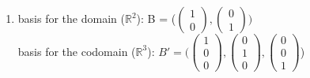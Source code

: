 \documentclass[notitlepage]{math}
\begin{document}
\begin{enumerate}[label=\protect\circled{\arabic*}]
    \item basis for the domain ($\mathbb{R}^2$): B = ($\begin{pmatrix} 1 \\ 0 \end{pmatrix}, \begin{pmatrix} 0 \\ 1 \end{pmatrix})$\\
    basis for the codomain ($\mathbb{R}^3$): $B' = (\begin{pmatrix} 1 \\ 0 \\ 0 \end{pmatrix}, \begin{pmatrix} 0 \\ 1 \\ 0 \end{pmatrix}, \begin{pmatrix} 0 \\ 0 \\ 1 \end{pmatrix}$)


\end{enumerate}
\end{document}
